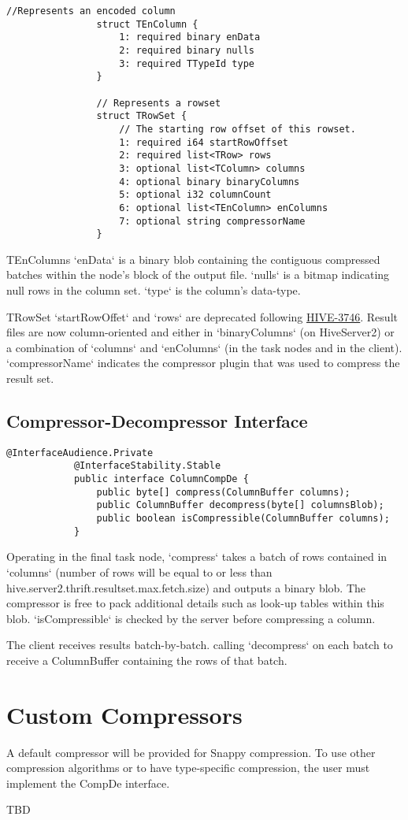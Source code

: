 \documentclass[11pt,a4paper]{article}
\begin{document}
			\begin{lstlisting}[title=TCLIService.thrift,gobble=8,otherkeywords={binary,i32,i64,string,struct,TColumn,TEnColumn,TRow,TRowSet,TTypeId}]
				//Represents an encoded column
				struct TEnColumn {
					1: required binary enData
					2: required binary nulls
					3: required TTypeId type
				}
				
				// Represents a rowset
				struct TRowSet {
					// The starting row offset of this rowset.
					1: required i64 startRowOffset
					2: required list<TRow> rows
					3: optional list<TColumn> columns
					4: optional binary binaryColumns
					5: optional i32 columnCount
					6: optional list<TEnColumn> enColumns
					7: optional string compressorName
				}
			\end{lstlisting}
			
			TEnColumns `enData` is a binary blob containing the contiguous compressed batches within the node's block of the output file.
			`nulls` is a bitmap indicating null rows in the column set.
			`type` is the column's data-type.
			
			TRowSet `startRowOffet` and `rows` are deprecated following \href{https://issues.apache.org/jira/browse/HIVE-3746}{HIVE-3746}.
			Result files are now column-oriented and either in `binaryColumns` (on HiveServer2) or a combination of `columns` and `enColumns` (in the task nodes and in the client).
			`compressorName` indicates the compressor plugin that was used to compress the result set.
			
	\subsection{Compressor-Decompressor Interface}
		\begin{lstlisting}[title=org.apache.hive.service.cli.CompDe; CompDe.java,gobble=6,otherkeywords={ColumnBuffer}]
			@InterfaceAudience.Private
			@InterfaceStability.Stable
			public interface ColumnCompDe {
				public byte[] compress(ColumnBuffer columns);
				public ColumnBuffer decompress(byte[] columnsBlob);
				public boolean isCompressible(ColumnBuffer columns);
			}
		\end{lstlisting}
		
		Operating in the final task node, `compress` takes a batch of rows contained in `columns` (number of rows will be equal to or less than \linebreak hive.server2.thrift.resultset.max.fetch.size) and outputs a binary blob.
		The compressor is free to pack additional details such as look-up tables within this blob.
		`isCompressible` is checked by the server before compressing a column.
		
		The client receives results batch-by-batch. calling `decompress` on each batch to receive a ColumnBuffer containing the rows of that batch.
			
\section{Custom Compressors}
		A default compressor will be provided for Snappy compression.
		To use other compression algorithms or to have type-specific compression, the user must implement the CompDe interface.
		
		TBD
		
\end{document}

